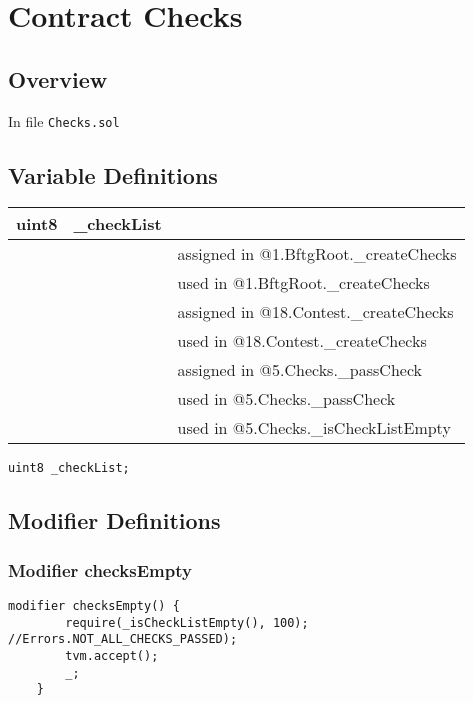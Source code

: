 
\chapter{Contract Checks}

\minitoc

\section{Overview}


In file {\tt Checks.sol}

\section{Variable Definitions}


\ifsoltables
\noindent\begin{tabular}{|l|l|p{5cm}|}\hline
uint8 & \_{}checkList &  \\\hline
 & & assigned in @1.BftgRoot.\_{}createChecks\\\hline
 & & used in @1.BftgRoot.\_{}createChecks\\\hline
 & & assigned in @18.Contest.\_{}createChecks\\\hline
 & & used in @18.Contest.\_{}createChecks\\\hline
 & & assigned in @5.Checks.\_{}passCheck\\\hline
 & & used in @5.Checks.\_{}passCheck\\\hline
 & & used in @5.Checks.\_{}isCheckListEmpty\\\hline
\end{tabular}
\fi


\begin{lstlisting}[firstnumber=4]
    uint8 _checkList;
\end{lstlisting}

\section{Modifier Definitions}


\subsection{Modifier checksEmpty}


\begin{lstlisting}[firstnumber=12]
    modifier checksEmpty() {
        require(_isCheckListEmpty(), 100); //Errors.NOT_ALL_CHECKS_PASSED);
        tvm.accept();
        _;
    }
\end{lstlisting}

